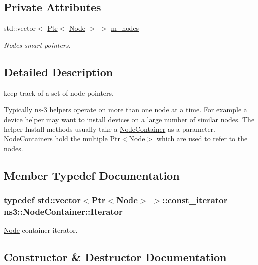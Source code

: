 \subsection*{Private Attributes}
\begin{DoxyCompactItemize}
\item 
std\+::vector$<$ \hyperlink{classns3_1_1Ptr}{Ptr}$<$ \hyperlink{classns3_1_1Node}{Node} $>$ $>$ \hyperlink{classns3_1_1NodeContainer_a1abd27b43170c03dbbb58785cdc9c17d}{m\+\_\+nodes}
\begin{DoxyCompactList}\small\item\em Nodes smart pointers. \end{DoxyCompactList}\end{DoxyCompactItemize}


\subsection{Detailed Description}
keep track of a set of node pointers. 

Typically ns-\/3 helpers operate on more than one node at a time. For example a device helper may want to install devices on a large number of similar nodes. The helper Install methods usually take a \hyperlink{classns3_1_1NodeContainer}{Node\+Container} as a parameter. Node\+Containers hold the multiple \hyperlink{classns3_1_1Ptr}{Ptr$<$\+Node$>$} which are used to refer to the nodes. 

\subsection{Member Typedef Documentation}
\subsubsection[{\texorpdfstring{Iterator}{Iterator}}]{\setlength{\rightskip}{0pt plus 5cm}typedef std\+::vector$<${\bf Ptr}$<${\bf Node}$>$ $>$\+::const\+\_\+iterator {\bf ns3\+::\+Node\+Container\+::\+Iterator}}\hypertarget{classns3_1_1NodeContainer_aa1a9f2d2b09bfef7d066d3974bca2cc4}{}\label{classns3_1_1NodeContainer_aa1a9f2d2b09bfef7d066d3974bca2cc4}


\hyperlink{classns3_1_1Node}{Node} container iterator. 



\subsection{Constructor \& Destructor Documentation}
